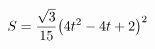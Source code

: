 \documentclass[preview]{standalone}
\begin{document}
\begin{align*}
\special{dvisvgm:raw <g id='unique000'>}S=\frac{\sqrt{3}}{15}\big(4t^2-4t+2\big)^2\special{dvisvgm:raw </g>}
\end{align*}
\end{document}
